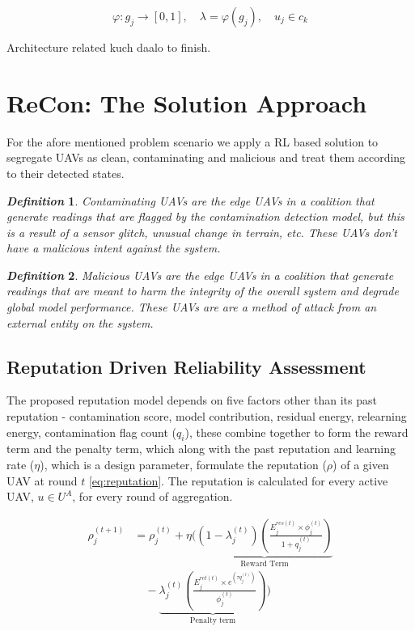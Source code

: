 \documentclass[10pt,journal,compsoc]{IEEEtran}
\newtheorem{mydef}{\textbf{\textit{Definition}}}
\begin{document}
\begin{equation}\label{eq:lamda_def}
\varphi: g_j \rightarrow [0,1], \quad \lambda = \varphi(g_j), \quad u_j \in c_k
\end{equation}

Architecture related kuch daalo to finish.



%
%
%
\section{ReCon: The Solution Approach}
For the afore mentioned problem scenario we apply a RL based solution to segregate UAVs as clean, contaminating and malicious and treat them according to their detected states.

\begin{mydef}
Contaminating UAVs are the edge UAVs in a coalition that generate readings that are flagged by the contamination detection model, but this is a result of a sensor glitch, unusual change in terrain, etc. These UAVs don't have a malicious intent against the system.
\end{mydef}

\begin{mydef}
Malicious UAVs are the edge UAVs in a coalition that generate readings that are meant to harm the integrity of the overall system and degrade global model performance. These UAVs are are a method of attack from an external entity on the system. 
\end{mydef}


\subsection{Reputation Driven Reliability Assessment}
The proposed reputation model depends on five factors other than its past reputation - contamination score, model contribution,  residual energy, relearning energy, contamination flag count ($q_i$), these combine together to form the reward term and the penalty term, which along with the past reputation and learning rate ($\eta$), which is a design parameter, formulate the reputation ($\rho$) of a given UAV at round $t$ \eqref{eq:reputation}. The reputation is calculated for every active UAV, $u \in U^A$, for every round of aggregation.

\begin{align}\label{eq:reputation}
\rho_j^{(t+1)}
&=
\rho_j^{(t)}
+
\eta
\Bigg(
\underbrace{
(1-\lambda_j^{(t)})
\left(
\frac{E_j^{res (t)} \times \phi_j^{(t)}} {1+q_j^{(t)}}
\right)
}_\text{Reward Term}
\nonumber\\
&\quad
-
\underbrace{
\lambda_j^{(t)}
\left(
\frac{E_j^{ret(t)} \times e^{(\tau q_j^{(t)})}}{\phi_j^{(t)}}
\right)
}_\text{Penalty term}
\Bigg)
\end{align}
\end{document}
